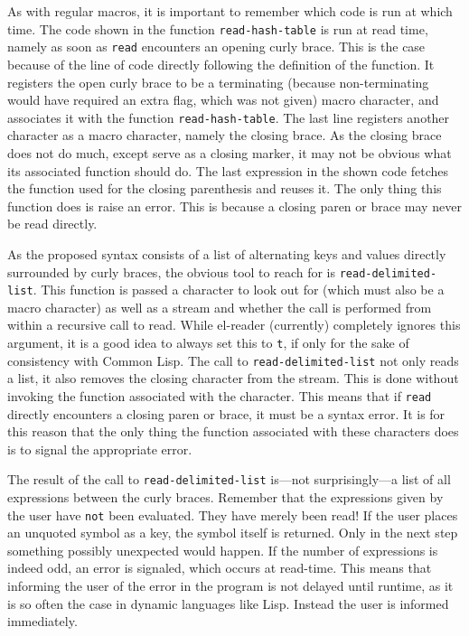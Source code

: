 \documentclass[a4paper,10pt,twoside]{report}
\newcommand{\cl}{Common Lisp}
\newcommand{\elr}{el-reader}
\newcommand{\sym}[1]{\texttt{#1}}
\newcommand{\fun}[1]{\texttt{#1}}
\newcommand{\Read}{\fun{read}}
\newcommand{\tee}{\sym{t}}
\begin{document}
As with regular macros, it is important to remember which code is run at which
time.  The code shown in the function \fun{read-hash-table} is run at read time,
namely as soon as \Read{} encounters an opening curly brace.  This is the case
because of the line of code directly following the definition of the function.
It registers the open curly brace to be a terminating (because non-terminating
would have required an extra flag, which was not given) macro character, and
associates it with the function \fun{read-hash-table}.  The last line registers
another character as a macro character, namely the closing brace.  As the
closing brace does not do much, except serve as a closing marker, it may not be
obvious what its associated function should do.  The last expression in the
shown code fetches the function used for the closing parenthesis and reuses it.
The only thing this function does is raise an error.  This is because a closing
paren or brace may never be read directly.

As the proposed syntax consists of a list of alternating keys and values
directly surrounded by curly braces, the obvious tool to reach for is
\fun{read-delimited-list}.  This function is passed a character to look out for
(which must also be a macro character) as well as a stream and whether the call
is performed from within a recursive call to read.  While \elr{} (currently)
completely ignores this argument, it is a good idea to always set this to
\tee{}, if only for the sake of consistency with \cl{}.  The call to
\fun{read-delimited-list} not only reads a list, it also removes the closing
character from the stream.  This is done without invoking the function
associated with the character.  This means that if \Read{} directly encounters a
closing paren or brace, it must be a syntax error.  It is for this reason that
the only thing the function associated with these characters does is to signal
the appropriate error.

The result of the call to \fun{read-delimited-list} is---not surprisingly---a
list of all expressions between the curly braces.  Remember that the expressions
given by the user have \texttt{not} been evaluated.  They have merely been read!
If the user places an unquoted symbol as a key, the symbol itself is returned.
Only in the next step something possibly unexpected would happen.  If the number
of expressions is indeed odd, an error is signaled, which occurs at read-time.
This means that informing the user of the error in the program is not delayed
until runtime, as it is so often the case in dynamic languages like Lisp.
Instead the user is informed immediately.
\end{document}
